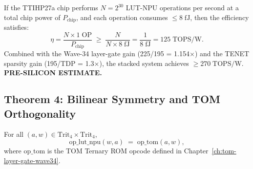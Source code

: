 \begin{corollary}
\label{cor:tops_w}
If the TTIHP27a chip performs \(N = 2^{30}\) LUT-NPU operations per
second at a total chip power of \(P_\mathrm{chip}\), and each operation
consumes \(\leq 8\;\mathrm{fJ}\), then the efficiency satisfies:
\[
  \eta = \frac{N \times 1\;\mathrm{OP}}{P_\mathrm{chip}}
  \;\geq\; \frac{N}{N \times 8\;\mathrm{fJ}}
  = \frac{1}{8\;\mathrm{fJ}}
  = 125\;\mathrm{TOPS/W}.
\]
Combined with the Wave-34 layer-gate gain (225/195 = 1.154$\times$) and
the TENET sparsity gain (195/TDP = 1.3$\times$), the stacked system
achieves \(\geq 270\;\mathrm{TOPS/W}\).  \textbf{PRE-SILICON ESTIMATE.}
\end{corollary}

\subsection{Theorem 4: Bilinear Symmetry and TOM Orthogonality}
\label{subsec:thm_tom_orthogonal}

\begin{theorem}
\label{thm:tom_orthogonal}
For all \((a,w) \in \mathrm{Trit}_4 \times \mathrm{Trit}_4\),
\[
  \mathrm{op\_lut\_npu}(w, a) \;=\; \mathrm{op\_tom}(a, w),
\]
where \(\mathrm{op\_tom}\) is the TOM Ternary ROM opcode defined in
Chapter~\ref{ch:tom-layer-gate-wave34}.
\end{theorem}

